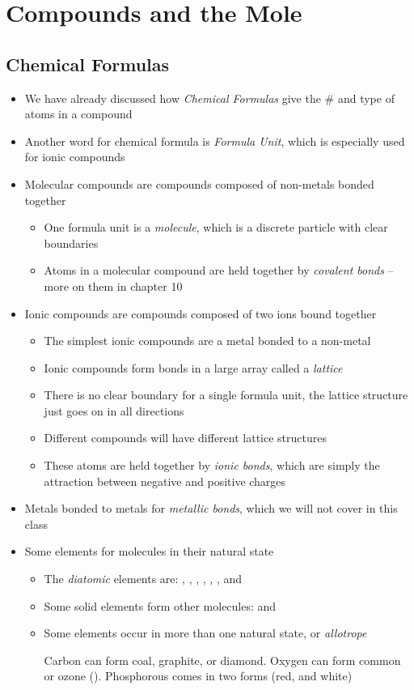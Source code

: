 \documentclass[12pt, openany, letterpaper]{memoir}
\begin{document}
\chapter{Compounds and the Mole}
\section{Chemical Formulas}
\begin{itemize}
	\item We have already discussed how \emph{Chemical Formulas} give the \# and type of atoms in a compound
	\item Another word for chemical formula is \emph{Formula Unit}, which is especially used for ionic compounds
	\item Molecular compounds are compounds composed of non-metals bonded together
	      \begin{itemize}
		      \item One formula unit is a \emph{molecule}, which is a discrete particle with clear boundaries
		      \item Atoms in a molecular compound are held together by \emph{covalent bonds} -- more on them in chapter 10
	      \end{itemize}
	\item Ionic compounds are compounds composed of two ions bound together
	      \begin{itemize}
		      \item The simplest ionic compounds are a metal bonded to a non-metal
		      \item Ionic compounds form bonds in a large array called a \emph{lattice}
		      \item There is no clear boundary for a single formula unit, the lattice structure just goes on in all directions
		      \item Different compounds will have different lattice structures
		      \item These atoms are held together by \emph{ionic bonds}, which are simply the attraction between negative and positive charges
	      \end{itemize}
	\item Metals bonded to metals for \emph{metallic bonds}, which we will not cover in this class
	\item Some elements for molecules in their natural state
	      \begin{itemize}
		      \item The \emph{diatomic} elements are: , , , , , , and 
		      \item Some solid elements form other molecules:  and 
		      \item Some elements occur in more than one natural state, or \emph{allotrope}

		            Carbon can form coal, graphite, or diamond. Oxygen can form common  or ozone (). Phosphorous comes in two forms (red, and white)
	      \end{itemize}
\end{itemize}
\end{document}
